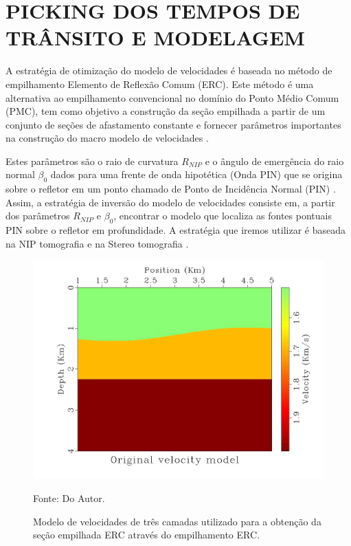 \chapter{PICKING DOS TEMPOS DE TRÂNSITO E MODELAGEM}
\label{cap9}

A estratégia de otimização do modelo de velocidades é baseada no método de empilhamento Elemento de Reflexão Comum (ERC).
Este método é uma alternativa ao empilhamento convencional no domínio do Ponto Médio Comum (PMC), tem como
objetivo a construção da seção empilhada a partir de um conjunto de seções de afastamento constante e
fornecer parâmetros importantes na construção do macro modelo de velocidades \cite{cre}.

Estes parâmetros são o raio de curvatura $R_{NIP}$ e o ângulo de emergência do raio normal $\beta_0$ dados para
uma frente de onda hipotética (Onda PIN) que se origina sobre o refletor em um ponto chamado de Ponto de Incidência Normal
(PIN) \cite{hubral}. Assim, a estratégia de inversão do modelo de velocidades consiste em, a partir dos parâmetros $R_{NIP}$
e $\beta_0$, encontrar o modelo que localiza as fontes pontuais PIN sobre o refletor em profundidade.
A estratégia que iremos utilizar é baseada na NIP tomografia \cite{niptomo} e na Stereo tomografia \cite{stereo}.

\begin{figure}[H]
\caption{Modelo de velocidades de três camadas utilizado para a obtenção da seção
empilhada ERC através do empilhamento ERC.}
\begin{center}
\includegraphics[scale=0.3]{images/mod1.jpeg}
\vspace{-0.3cm}
\end{center}
\begin{center}
 Fonte: Do Autor.
\end{center}
\label{fig:9.1}
\end{figure}

